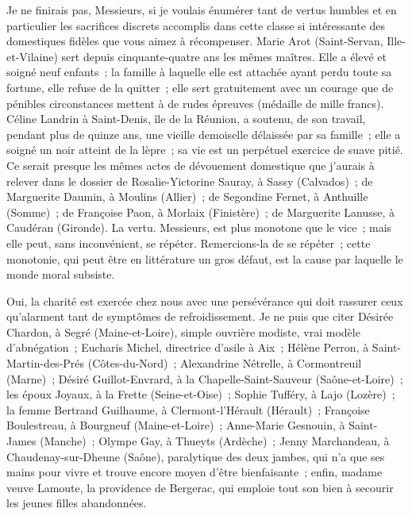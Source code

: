 \documentclass[french,twoside]{book} %
\newcommand\orgName[1]{#1}
\newcommand\persName[1]{#1}
\newcommand\placeName[1]{#1}
\begin{document}
Je ne finirais pas, Messieurs, si je voulais énumérer tant de vertus humbles et en particulier les sacrifices discrets accomplis dans cette classe si intéressante des domestiques fidèles que vous aimez à récompenser. {\persName Marie Arot} ({\placeName Saint-Servan}, {\placeName Ille-et-Vilaine}) sert depuis cinquante-quatre ans les mêmes maîtres. Elle a élevé et soigné neuf enfants ; la famille à laquelle elle est attachée ayant perdu toute sa fortune, elle refuse de la quitter ; elle sert gratuitement avec un courage que de pénibles circonstances mettent à de rudes épreuves (médaille de mille francs). {\persName Céline Landrin} à {\placeName Saint-Denis}, {\placeName île de la Réunion}, a soutenu, de son travail, pendant plus de quinze ans, une vieille demoiselle délaissée par sa famille ; elle a soigné un noir atteint de la lèpre ; sa vie est un perpétuel exercice de suave pitié. Ce serait presque les mêmes actes de dévouement domestique que j’aurais à relever dans le dossier de {\persName Rosalie-Yictorine Sauray}, à {\placeName Sassy} ({\placeName Calvados}) ; de {\persName Marguerite Daumin}, à {\placeName Moulins} ({\placeName Allier}) ; de {\persName Segondine Fernet}, à {\placeName Anthuille} ({\placeName Somme}) ; de {\persName Françoise Paon}, à {\placeName Morlaix} ({\placeName Finistère}) ; de {\persName Marguerite Lanusse}, à {\placeName Caudéran} ({\placeName Gironde}). La vertu. Messieurs, est plus monotone que le vice ; mais elle peut, sans inconvénient, se répéter. Remercions-la de se répéter ; cette monotonie, qui peut être en littérature un gros défaut, est la cause par laquelle le monde moral subsiste.\par
Oui, la charité est exercée chez nous avec une persévérance qui doit rassurer ceux qu’alarment tant de symptômes de refroidissement. Je ne puis que citer {\persName Désirée Chardon}, à {\placeName Segré} ({\placeName Maine-et-Loire}), simple ouvrière modiste, vrai modèle d’abnégation ; {\persName Eucharis Michel}, directrice d’asile à {\placeName Aix} ; {\persName Hélène Perron}, à {\placeName Saint-Martin-des-Prés} ({\placeName Côtes-du-Nord}) ; {\persName Alexandrine Nétrelle}, à {\placeName Cormontreuil} ({\placeName Marne}) ; {\persName Désiré Guillot-Envrard}, à la {\placeName Chapelle-Saint-Sauveur} ({\placeName Saône-et-Loire}) ; les {\orgName époux Joyaux}, à la {\placeName Frette} ({\placeName Seine-et-Oise}) ; {\persName Sophie Tufféry}, à {\placeName Lajo} ({\placeName Lozère}) ; la {\persName femme Bertrand Guilhaume}, à {\placeName Clermont-l’Hérault} ({\placeName Hérault}) ; {\persName Françoise Boulestreau}, à {\placeName Bourgneuf} ({\placeName Maine-et-Loire}) ; {\persName Anne-Marie Gesnouin}, à {\placeName Saint-James} ({\placeName Manche}) ; {\persName Olympe Gay}, à {\placeName Thueyts} ({\placeName Ardèche}) ; {\persName Jenny Marchandeau}, à {\placeName Chaudenay-sur-Dheune} ({\placeName Saône}), paralytique des deux jambes, qui n’a que ses mains pour vivre et trouve encore moyen d’être bienfaisante ; enfin, {\persName madame veuve Lamoute}, la providence de {\placeName Bergerac}, qui emploie tout son bien à secourir les jeunes filles abandonnées.\par
\end{document}
